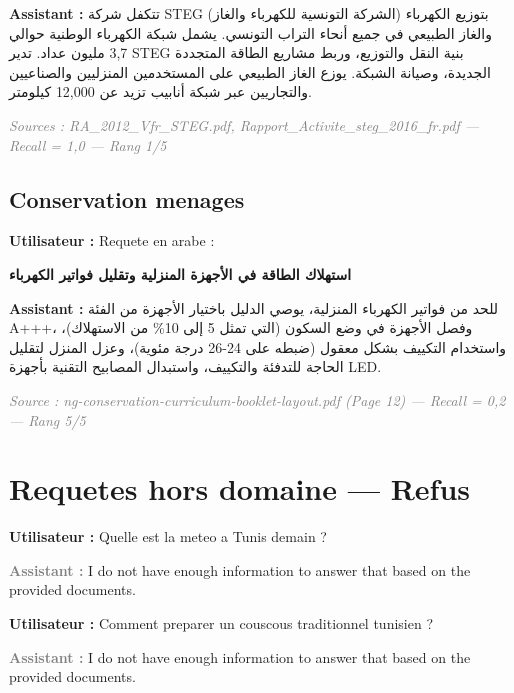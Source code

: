 \documentclass[12pt,a4paper,oneside]{article}
\newcommand{\prompt}[1]{%
  \noindent\colorbox{PromptBg}{\parbox{\dimexpr\linewidth-2\fboxsep}{%
    \small\textbf{\textcolor{MainBlue}{Utilisateur :}} #1%
  }}\vspace{3pt}%
}
\newcommand{\botreply}[1]{%
  \noindent\colorbox{OutputBg}{\parbox{\dimexpr\linewidth-2\fboxsep}{%
    \small\textbf{\textcolor{PassGreen!70!black}{Assistant :}} #1%
  }}\vspace{6pt}%
}
\newcommand{\refusereply}[1]{%
  \noindent\colorbox{RefuseBg}{\parbox{\dimexpr\linewidth-2\fboxsep}{%
    \small\textbf{\textcolor{gray}{Assistant :}} #1%
  }}\vspace{6pt}%
}
\begin{document}
\botreply{
{\arabicfont تتكفل شركة STEG (الشركة التونسية للكهرباء والغاز) بتوزيع الكهرباء والغاز الطبيعي في جميع أنحاء التراب التونسي. يشمل شبكة الكهرباء الوطنية حوالي 3,7 مليون عداد. تدير STEG بنية النقل والتوزيع، وربط مشاريع الطاقة المتجددة الجديدة، وصيانة الشبكة. يوزع الغاز الطبيعي على المستخدمين المنزليين والصناعيين والتجاريين عبر شبكة أنابيب تزيد عن 12,000 كيلومتر.}
}

\noindent\small\textit{\textcolor{gray}{Sources : RA\_2012\_Vfr\_STEG.pdf, Rapport\_Activite\_steg\_2016\_fr.pdf --- Recall = 1,0 --- Rang 1/5}}

\bigskip

\subsection{Conservation menages}

\prompt{Requete en arabe :}
{\arabicfont\large\bfseries استهلاك الطاقة في الأجهزة المنزلية وتقليل فواتير الكهرباء}

\botreply{
{\arabicfont للحد من فواتير الكهرباء المنزلية، يوصي الدليل باختيار الأجهزة من الفئة A+++، وفصل الأجهزة في وضع السكون (التي تمثل 5 إلى 10\% من الاستهلاك)، واستخدام التكييف بشكل معقول (ضبطه على 24-26 درجة مئوية)، وعزل المنزل لتقليل الحاجة للتدفئة والتكييف، واستبدال المصابيح التقنية بأجهزة LED.}
}

\noindent\small\textit{\textcolor{gray}{Source : ng-conservation-curriculum-booklet-layout.pdf (Page 12) --- Recall = 0,2 --- Rang 5/5}}

\clearpage

\section{Requetes hors domaine --- Refus}

\prompt{Quelle est la meteo a Tunis demain ?}

\refusereply{I do not have enough information to answer that based on the provided documents.}

\prompt{Comment preparer un couscous traditionnel tunisien ?}

\refusereply{I do not have enough information to answer that based on the provided documents.}

\clearpage

\end{document}

